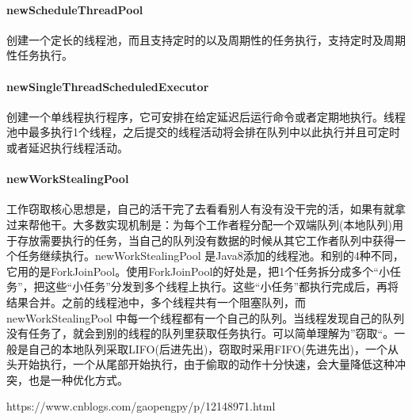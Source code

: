 \documentclass[../../../interview-questions.tex]{subfiles}
\begin{document}
\paragraph{newScheduleThreadPool}

创建一个定长的线程池，而且支持定时的以及周期性的任务执行，支持定时及周期性任务执行。

\paragraph{newSingleThreadScheduledExecutor}

创建一个单线程执行程序，它可安排在给定延迟后运行命令或者定期地执行。线程池中最多执行1个线程，之后提交的线程活动将会排在队列中以此执行并且可定时或者延迟执行线程活动。

\paragraph{newWorkStealingPool}工作窃取核心思想是，自己的活干完了去看看别人有没有没干完的活，如果有就拿过来帮他干。大多数实现机制是：为每个工作者程分配一个双端队列(本地队列)用于存放需要执行的任务，当自己的队列没有数据的时候从其它工作者队列中获得一个任务继续执行。newWorkStealingPool 是Java8添加的线程池。和别的4种不同，它用的是ForkJoinPool。使用ForkJoinPool的好处是，把1个任务拆分成多个“小任务”，把这些“小任务”分发到多个线程上执行。这些“小任务”都执行完成后，再将结果合并。之前的线程池中，多个线程共有一个阻塞队列，而newWorkStealingPool 中每一个线程都有一个自己的队列。当线程发现自己的队列没有任务了，就会到别的线程的队列里获取任务执行。可以简单理解为”窃取“。一般是自己的本地队列采取LIFO(后进先出)，窃取时采用FIFO(先进先出)，一个从头开始执行，一个从尾部开始执行，由于偷取的动作十分快速，会大量降低这种冲突，也是一种优化方式。

https://www.cnblogs.com/gaopengpy/p/12148971.html
\end{document}
